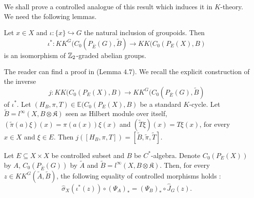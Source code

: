 We shall prove a controlled analogue of this result which induces it in $K$-theory. We need the following lemmas. %


\begin{lem}\label{iota}
Let $x\in X$ and $\iota : \{x\}\hookrightarrow G$ the natural inclusion of groupoids. Then 
\[\iota^* : KK^G(C_0(P_{\overline E}(G),\tilde B) \rightarrow KK(C_0(P_{E}(X),B) \]
is an isomorphism of $\mathbb Z_2$-graded abelian groups.
\end{lem}

The reader can find a proof in \cite{SkTuYu} (Lemma $4.7$). We recall the explicit construction of the inverse 
\[j:KK(C_0(P_{E}(X),B) \rightarrow KK^G(C_0(P_{\overline E}(G),\tilde B)\] 
of $\iota^*$. Let $(H_B,\pi,T)\in\mathbb E (C_0(P_{E}(X),B)$ be a standard $K$-cycle. Let $\tilde B= l^\infty(X,B\otimes\mathfrak K)$ seen as Hilbert module over itself, $(\tilde \pi (a)\xi)(x) = \pi(a(x))\xi(x)$ and $(\tilde T\xi ) (x) = T\xi(x)$, for every $x\in X$ and $\xi\in E$. Then $j([H_B,\pi,T])=[\tilde B,\tilde \pi, \tilde T]$.

\begin{lem} Let $E\subseteq X\times X$ be controlled subset and $B$ be $C^*$-algebra. Denote $C_0(P_E(X))$ by $A$, $C_0(P_{\overline E}(G))$ by $\tilde A$ and $\tilde B = l^\infty(X,B\otimes \mathfrak K)$. Then, for every $z\in KK^G(\tilde A,\tilde B)$, the following equality of controlled morphisms holds :
\[\hat\sigma_X(\iota^*(z))\circ (\Psi_A)_* = (\Psi_B)_*\circ \hat J_G(z).\]  
\end{lem}


